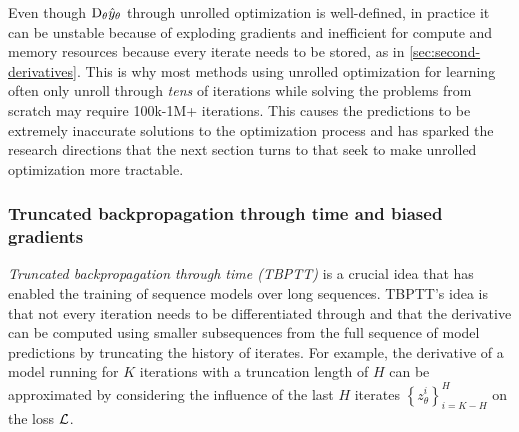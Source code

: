 Even though $\mathrm{D}_\theta \hat y_\theta$ through unrolled
optimization is well-defined, in practice it can be
unstable because of exploding gradients
\citep{pearlmutter1996investigation,pascanu2013difficulty,maclaurin2016modeling,parmas2018pipps}
and inefficient for compute and memory resources because
every iterate needs to be stored,
as in \cref{sec:second-derivatives}.
This is why most methods using unrolled optimization for learning
often only unroll through \emph{tens} of iterations
\citep{metz2016unrolled,belanger2017end,foerster2017learning,finn2017model}
while solving the problems from scratch may
require 100k-1M+ iterations.
This causes the predictions to be extremely inaccurate solutions
to the optimization process and has sparked the research directions
that the next section turns to that seek to make unrolled optimization
more tractable.

\subsubsection{Truncated backpropagation through time and biased gradients}
\begin{center}
\end{center}
\vspace{-10mm}

\emph{Truncated backpropagation through time (TBPTT)}
\citep{werbos1990backpropagation,jaeger2002tutorial}
is a crucial idea that has enabled the
training of sequence models over long sequences.
TBPTT's idea is that not every iteration needs to be
differentiated through and that the derivative
can be computed using smaller subsequences from
the full sequence of model predictions by
truncating the history of iterates.
For example, the derivative of a model running
for $K$ iterations with a truncation length of $H$
can be approximated by considering the
influence of the last $H$ iterates
$\left\{z_\theta^{i}\right\}_{i=K-H}^H$ on the loss ${\mathcal{L}}$.

